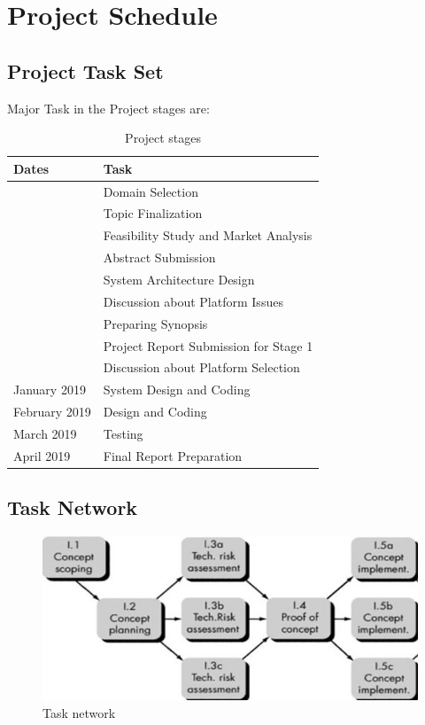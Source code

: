 \documentclass[oneside,a4paper,12pt]{book}
\begin{document}
\section{Project Schedule}
\subsection{Project Task Set}
Major Task in the Project stages are:
\begin{table}[ht]
    \centering
    \large
     \begin{tabular}{ | p{3.7cm} | p{10cm} |}
    \hline
    Dates  & 	Task \\\hline
     & 	Domain Selection \\ \hline
     & 	Topic Finalization \\ \hline
     &	Feasibility Study and Market Analysis \\ \hline
     &  Abstract Submission \\ \hline
     &	System Architecture Design \\ \hline
     &	Discussion about Platform Issues \\ \hline
     &	Preparing Synopsis \\ \hline
     &	Project Report Submission for Stage 1 \\ \hline
     &  Discussion about Platform Selection \\ \hline
    January 2019 &	System Design and Coding \\ \hline
    February 2019 &	Design and Coding \\ \hline
    March 2019 &	Testing \\ \hline
    April 2019 &	Final Report Preparation \\ \hline
    \end{tabular}
    \caption{Project stages}
\end{table}
\subsection{Task Network}
\begin{figure}[h]
\begin{center}
\includegraphics[scale=0.8]{tasks.jpg}
\caption{Task network}
\end{center}
\end{figure}
\end{document}
